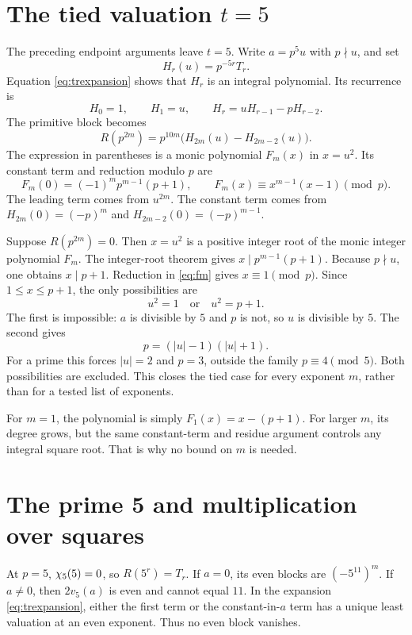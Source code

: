 \section{The tied valuation \texorpdfstring{$t=5$}{t=5}}
The preceding endpoint arguments leave $t=5$. Write $a=p^5u$ with $p\nmid u$, and set
\[
H_r(u)=p^{-5r}T_r.
\]
Equation \eqref{eq:trexpansion} shows that $H_r$ is an integral polynomial. Its recurrence is
\[
H_0=1,\qquad H_1=u,\qquad H_r=uH_{r-1}-pH_{r-2}.
\]
The primitive block becomes
\begin{equation}\label{eq:tied}
R(p^{2m})=p^{10m}\bigl(H_{2m}(u)-H_{2m-2}(u)\bigr).
\end{equation}
The expression in parentheses is a monic polynomial $F_m(x)$ in $x=u^2$. Its constant term and reduction modulo $p$ are
\begin{equation}\label{eq:fm}
F_m(0)=(-1)^mp^{m-1}(p+1),\qquad
F_m(x)\equiv x^{m-1}(x-1)\pmod p.
\end{equation}
The leading term comes from $u^{2m}$. The constant term comes from $H_{2m}(0)=(-p)^m$ and $H_{2m-2}(0)=(-p)^{m-1}$.

Suppose $R(p^{2m})=0$. Then $x=u^2$ is a positive integer root of the monic integer polynomial $F_m$. The integer-root theorem gives $x\mid p^{m-1}(p+1)$. Because $p\nmid u$, one obtains $x\mid p+1$. Reduction in \eqref{eq:fm} gives $x\equiv1\pmod p$. Since $1\le x\le p+1$, the only possibilities are
\[
u^2=1\quad\text{or}\quad u^2=p+1.
\]
The first is impossible: $a$ is divisible by $5$ and $p$ is not, so $u$ is divisible by $5$. The second gives
\[
p=(|u|-1)(|u|+1).
\]
For a prime this forces $|u|=2$ and $p=3$, outside the family $p\equiv4\pmod5$. Both possibilities are excluded. This closes the tied case for every exponent $m$, rather than for a tested list of exponents.

For $m=1$, the polynomial is simply $F_1(x)=x-(p+1)$. For larger $m$, its degree grows, but the same constant-term and residue argument controls any integral square root. That is why no bound on $m$ is needed.

\section{The prime 5 and multiplication over squares}
At $p=5$, $\chi_5(5)=0$, so $R(5^r)=T_r$. If $a=0$, its even blocks are $(-5^{11})^m$. If $a\ne0$, then $2v_5(a)$ is even and cannot equal $11$. In the expansion \eqref{eq:trexpansion}, either the first term or the constant-in-$a$ term has a unique least valuation at an even exponent. Thus no even block vanishes.

